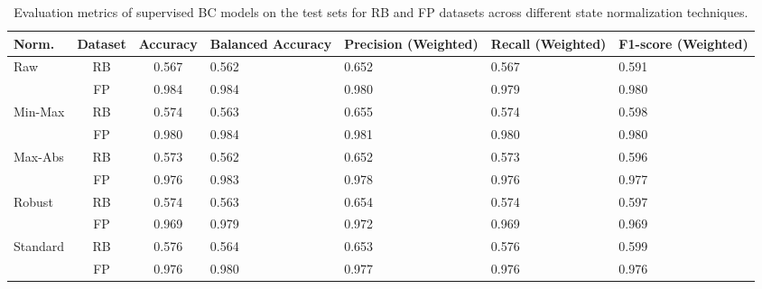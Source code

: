 \begin{table}[!ht]
\centering
\caption{Evaluation metrics of supervised BC models on the test sets for RB and FP datasets across different state normalization techniques.}
\label{tab:bc_evaluation_metrics}

\renewcommand{\arraystretch}{1.2}  %

\begin{tabular}{p{1.5cm} c c p{1.75cm} p{1.75cm} p{1.75cm} p{1.75cm}}
\hline
\textbf{Norm.} 
& \textbf{Dataset} 
& \textbf{Accuracy} 
& \textbf{Balanced Accuracy}
& \textbf{Precision (Weighted)} 
& \textbf{Recall (Weighted)} 
& \textbf{F1-score (Weighted)} \\
\hline
Raw        & RB & 0.567 & 0.562 & 0.652 & 0.567 & 0.591 \\
           & FP & 0.984 & 0.984 & 0.980 & 0.979 & 0.980 \\
\hline
Min-Max    & RB & 0.574 & 0.563 & 0.655 & 0.574 & 0.598  \\
           & FP & 0.980 & 0.984 & 0.981 & 0.980 & 0.980 \\
\hline
Max-Abs    & RB & 0.573 & 0.562 & 0.652 & 0.573 & 0.596 \\
           & FP & 0.976 & 0.983 & 0.978 & 0.976 & 0.977 \\
\hline
Robust     & RB & 0.574 & 0.563 & 0.654 & 0.574 & 0.597  \\
           & FP & 0.969 & 0.979 & 0.972 & 0.969 & 0.969 \\
\hline
Standard   & RB & 0.576 & 0.564 & 0.653 & 0.576 & 0.599 \\
           & FP & 0.976 & 0.980 & 0.977 & 0.976 & 0.976  \\
\hline
\end{tabular}
\end{table}